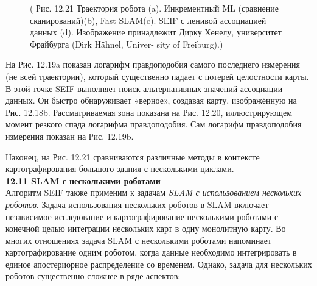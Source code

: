 \documentclass[10pt,a4paper]{article}
\begin{document}
\begin{figure}[H]
	\caption{ ( Рис. 12.21 Траектория робота (a). Инкрементный ML (сравнение сканирований)(b),  Fast SLAM(c). SEIF с ленивой ассоциацией данных (d). Изображение принадлежит Дирку Хенелу, университет Фрайбурга (Dirk Hähnel, Univer- sity of Freiburg).) }
	\label{fig:1221orig}
\end{figure}

На Рис. 12.19a показан логарифм правдоподобия самого последнего измерения (не всей траектории), который существенно падает с потерей целостности карты. В этой точке SEIF выполняет поиск альтернативных значений ассоциации данных. Он быстро обнаруживает «верное», создавая карту, изображённую на Рис. 12.18b. Рассматриваемая зона показана на Рис. 12.20, иллюстрирующем 
момент резкого спада логарифма правдоподобия. Сам логарифм правдоподобия измерения показан на Рис. 12.19b.

Наконец, на Рис. 12.21 сравниваются различные методы в контексте картографирования большого здания с несколькими циклами.\\

\textbf{12.11	SLAM с несколькими роботами}\\

Алгоритм SEIF также применим к задачам \textit{SLAM с использованием нескольких роботов}. Задача использования нескольких роботов в SLAM включает независимое исследование и картографирование несколькими роботами с конечной целью интеграции нескольких карт в одну монолитную карту. Во многих отношениях задача SLAM с несколькими роботами напоминает картографирование одним роботом, когда данные необходимо интегрировать в единое апостериорное распределение со временем. Однако, задача для нескольких роботов существенно сложнее в ряде аспектов:\\
\end{document}
